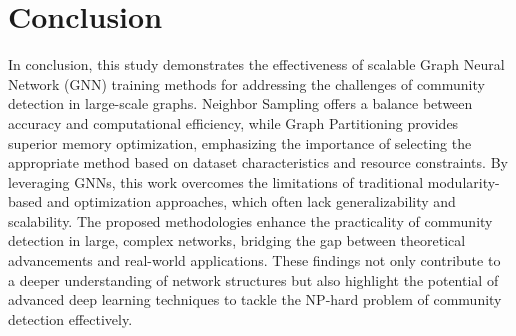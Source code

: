 \documentclass{article}
\begin{document}
\section{Conclusion}

In conclusion, this study demonstrates the effectiveness of scalable Graph Neural Network (GNN) training methods for addressing the challenges of community detection in large-scale graphs. Neighbor Sampling offers a balance between accuracy and computational efficiency, while Graph Partitioning provides superior memory optimization, emphasizing the importance of selecting the appropriate method based on dataset characteristics and resource constraints. By leveraging GNNs, this work overcomes the limitations of traditional modularity-based and optimization approaches, which often lack generalizability and scalability. The proposed methodologies enhance the practicality of community detection in large, complex networks, bridging the gap between theoretical advancements and real-world applications. These findings not only contribute to a deeper understanding of network structures but also highlight the potential of advanced deep learning techniques to tackle the NP-hard problem of community detection effectively.




\end{document}
